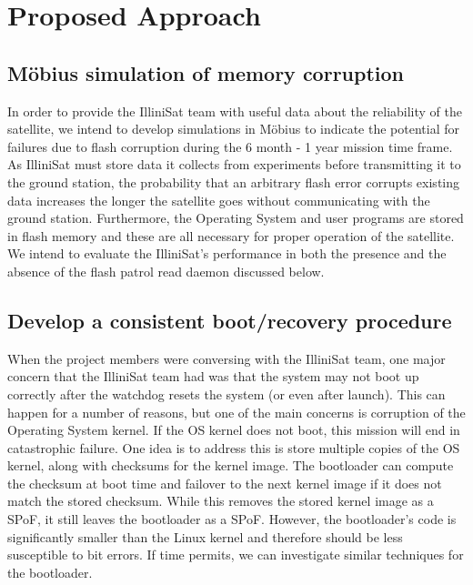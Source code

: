 \section{Proposed Approach}
\subsection{M\"obius simulation of memory corruption}
In order to provide the IlliniSat team with useful data about the reliability of
the satellite, we intend to develop simulations in M\"obius to indicate the
potential for failures due to flash corruption during the 6 month - 1 year
mission time frame.  As IlliniSat must store data it collects from experiments
before transmitting it to the ground station, the probability that an arbitrary
flash error corrupts existing data increases the longer the satellite goes
without communicating with the ground station.  Furthermore, the Operating
System and user programs are stored in flash memory and these are all necessary
for proper operation of the satellite.  We intend to evaluate the IlliniSat's
performance in both the presence and the absence of the flash patrol read daemon
discussed below.

\subsection{Develop a consistent boot/recovery procedure}
When the project members were conversing with the IlliniSat team, one major
concern that the IlliniSat team had was that the system may not boot up
correctly after the watchdog resets the system (or even after launch).  This can
happen for a number of reasons, but one of the main concerns is corruption of
the Operating System kernel.  If the OS kernel does not boot, this mission will
end in catastrophic failure.  One idea is to address this is store multiple
copies of the OS kernel, along with checksums for the kernel image.  The
bootloader can compute the checksum at boot time and failover to the next kernel
image if it does not match the stored checksum.  While this removes the stored
kernel image as a SPoF, it still leaves the bootloader as a SPoF.  However, the
bootloader's code is significantly smaller than the Linux kernel and therefore
should be less susceptible to bit errors.  If time permits, we can investigate
similar techniques for the bootloader. 

